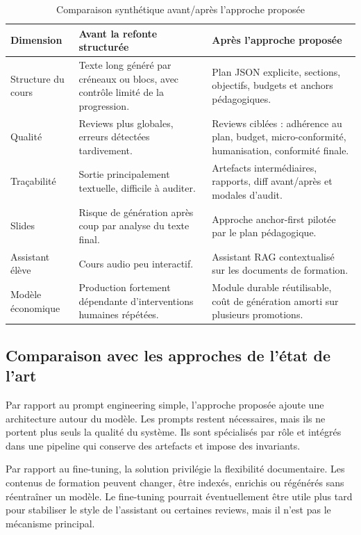 \begin{table}[h]
\centering
\small
\begin{tabular}{|p{3.3cm}|p{4.4cm}|p{4.4cm}|}
\hline
\textbf{Dimension} & \textbf{Avant la refonte structurée} & \textbf{Après l'approche proposée} \\
\hline
Structure du cours &
Texte long généré par créneaux ou blocs, avec contrôle limité de la progression. &
Plan JSON explicite, sections, objectifs, budgets et anchors pédagogiques. \\
\hline
Qualité &
Reviews plus globales, erreurs détectées tardivement. &
Reviews ciblées : adhérence au plan, budget, micro-conformité, humanisation, conformité finale. \\
\hline
Traçabilité &
Sortie principalement textuelle, difficile à auditer. &
Artefacts intermédiaires, rapports, diff avant/après et modales d'audit. \\
\hline
Slides &
Risque de génération après coup par analyse du texte final. &
Approche anchor-first pilotée par le plan pédagogique. \\
\hline
Assistant élève &
Cours audio peu interactif. &
Assistant RAG contextualisé sur les documents de formation. \\
\hline
Modèle économique &
Production fortement dépendante d'interventions humaines répétées. &
Module durable réutilisable, coût de génération amorti sur plusieurs promotions. \\
\hline
\end{tabular}
\caption{Comparaison synthétique avant/après l'approche proposée}
\end{table}

\subsection{Comparaison avec les approches de l'état de l'art}

Par rapport au prompt engineering simple, l'approche proposée ajoute une architecture
autour du modèle. Les prompts restent nécessaires, mais ils ne portent plus seuls la
qualité du système. Ils sont spécialisés par rôle et intégrés dans une pipeline qui conserve
des artefacts et impose des invariants.

Par rapport au fine-tuning, la solution privilégie la flexibilité documentaire. Les contenus
de formation peuvent changer, être indexés, enrichis ou régénérés sans réentraîner un
modèle. Le fine-tuning pourrait éventuellement être utile plus tard pour stabiliser le style
de l'assistant ou certaines reviews, mais il n'est pas le mécanisme principal.

